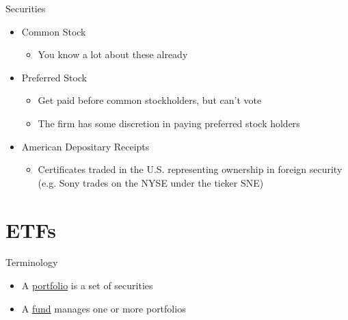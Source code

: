 \documentclass{beamer}
\begin{document}
\begin{frame}{Securities}
	\begin{itemize}
		\item Common Stock
	\begin{itemize}
		\item You know a lot about these already
	\end{itemize} 
		\item Preferred Stock
	\begin{itemize}
		\item Get paid before common stockholders, but can't vote
		\item The firm has some discretion in paying preferred stock holders
	\end{itemize} 
		\item American Depositary Receipts
	\begin{itemize}
		\item Certificates traded in the U.S. representing ownership in foreign security (e.g. Sony trades on the NYSE under the ticker SNE)
	\end{itemize}
	\end{itemize}
\end{frame}


\section{ETFs}

\iffalse
\begin{frame}{Terminology}
\begin{itemize}
	\item A \underline{portfolio} is a set of securities
	\item A \underline{fund} manages one or more portfolios
\end{itemize}
\end{frame}
\end{document}
